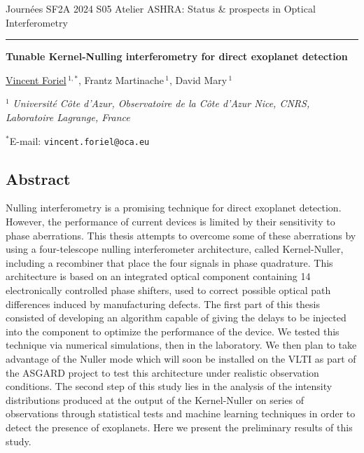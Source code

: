 \documentclass[12pt]{article}
\begin{document}
Journées SF2A 2024
\hfill
S05 Atelier ASHRA: Status \& prospects in Optical Interferometry

\smallskip
\hrule

\bigskip

\begin{center}
\LARGE \bf Tunable Kernel-Nulling interferometry for direct exoplanet detection\rm

\vspace{0.5cm}

\large  \underline{Vincent Foriel}$\,^{1,*}$, \large Frantz Martinache$\,^1$, \large David Mary$\,^1$

\vspace{0.5cm}

\normalsize

$^1$ \textit{Université Côte d’Azur, Observatoire de la Côte d’Azur Nice, CNRS, Laboratoire Lagrange, France}

\vspace{0.3cm}
$^*$E-mail: {\tt vincent.foriel@oca.eu}

\end{center}
\vspace{-0.8cm}
\subsection*{\Large Abstract}

Nulling interferometry is a promising technique for direct exoplanet detection. However, the performance of current devices is limited by their sensitivity to phase aberrations. This thesis attempts to overcome some of these aberrations by using a four-telescope nulling interferometer architecture, called Kernel-Nuller\cite{Chingaipe et al. 2022}, including a recombiner that place the four signals in phase quadrature. This architecture is based on an integrated optical component containing 14 electronically controlled phase shifters, used to correct possible optical path differences induced by manufacturing defects. The first part of this thesis consisted of developing an algorithm capable of giving the delays to be injected into the component to optimize the performance of the device. We tested this technique via numerical simulations, then in the laboratory. We then plan to take advantage of the Nuller mode which will soon be installed on the VLTI as part of the ASGARD project to test this architecture under realistic observation conditions. The second step of this study lies in the analysis of the intensity distributions produced at the output of the Kernel-Nuller\cite{Chingaipe et al. 2022, Cvetojevic et al. 2022} on series of observations through statistical tests and machine learning techniques in order to detect the presence of exoplanets. Here we present the preliminary results of this study.
\end{document}
